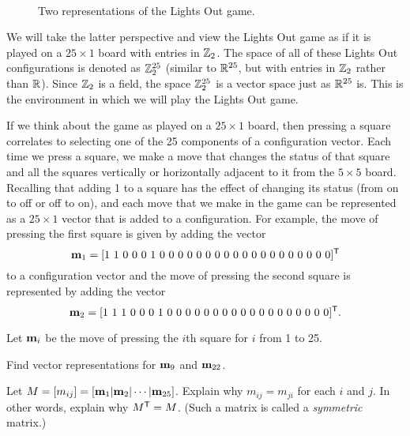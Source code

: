 \begin{figure}[h]
\begin{center}

\resizebox{!}{1.0in}{\texttt{[image: LO]}} \\

\vspace{6pt}


\end{center}
\caption{Two representations of the Lights Out game.}
\label{F:LO}
\end{figure}

We will take the latter perspective and view the Lights Out game as if it is played on a $25 \times 1$ board with entries in $\mathbb{Z}_2$. The space of all of these Lights Out configurations is denoted as $\mathbb{Z}_2^{25}$ (similar to $\mathbb{R}^{25}$, but with entries in $\mathbb{Z}_2$ rather than $\mathbb{R}$). Since $\mathbb{Z}_2$ is a field, the space $\mathbb{Z}_2^{25}$ is a vector space just as $\mathbb{R}^{25}$ is. This is the environment in which we will play the Lights Out game.

If we think about the game as played on a $25 \times 1$ board, then pressing a square correlates to selecting one of the 25 components of a configuration vector. Each time we press a square, we make a move that changes the status of that square and all the squares vertically or horizontally adjacent to it from the $5 \times 5$ board. Recalling that adding 1 to a square has the effect of changing its status (from on to off or off to on), and each move that we make in the game can be represented as a $25 \times 1$ vector that is added to a configuration. For example, the move of pressing the first square is given by adding the vector
\[\mathbf{m}_{1} = [ 1 \ 1 \ 0 \ 0 \ 0 \ 1 \ 0 \ 0 \ 0 \ 0 \ 0 \ 0 \ 0 \ 0 \ 0 \ 0 \ 0 \ 0 \ 0 \ 0\  0 \ 0 \ 0 \ 0 \ 0 ]^{\mathsf{T}}\]
to a configuration vector and the move of pressing the second square is represented by adding the vector 
\[\mathbf{m}_{2} = [ 1 \ 1 \ 1 \ 0 \ 0 \ 0 \ 1 \ 0 \ 0 \ 0 \ 0 \ 0 \ 0 \ 0 \ 0 \ 0 \ 0 \ 0 \ 0 \ 0\  0 \ 0 \ 0 \ 0 \ 0 ]^{\mathsf{T}}.\]



\begin{pactivity} Let $\mathbf{m}_i$ be the move of pressing the $i$th square for $i$ from 1 to 25. 
\ba
\item Find vector representations for $\mathbf{m}_9$ and $\mathbf{m}_{22}$. %


\item Let $M = [m_{ij}] =  \left[\mathbf{m}_1 | \mathbf{m}_2 | \cdots | \mathbf{m}_{25} \right]$. Explain why $m_{ij} = m_{ji}$ for each $i$ and $j$. In other words, explain why $M^{\mathsf{T}} = M$. (Such a matrix is called a \emph{symmetric} matrix.)


\ea

\end{pactivity}

